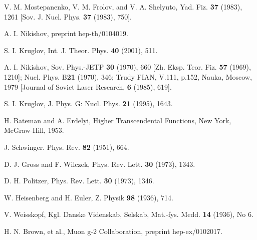 \documentclass[a4paper,12pt]{article}
\begin{document}
\begin{thebibliography}{99}
\bibitem{}  V. M. Mostepanenko, V. M. Frolov, and V. A. Shelyuto, Yad. Fiz.
\textbf{37} (1983), 1261 [Sov. J. Nucl. Phys. \textbf{37 }(1983), 750].

\bibitem{}  A. I. Nikishov, preprint hep-th/0104019.

\bibitem{}  S. I. Kruglov, Int. J. Theor. Phys. \textbf{40} (2001), 511.

\bibitem{}  A. I. Nikishov, Sov. Phys.-JETP \textbf{30} (1970), 660 [Zh.
Eksp. Teor. Fiz. \textbf{57} (1969), 1210]; Nucl. Phys. B\textbf{21 }(1970),
346; Trudy FIAN, V.111, p.152, Nauka, Moscow, 1979 [Journal of Soviet Laser
Research, \textbf{6 }(1985), 619].

\bibitem{}  S. I. Kruglov, J. Phys. G: Nucl. Phys. \textbf{21} (1995), 1643.

\bibitem{}  H. Bateman and A. Erdelyi, Higher Transcendental Functions, New
York, McGraw-Hill, 1953.

\bibitem{}  J. Schwinger. Phys. Rev. \textbf{82} (1951), 664.

\bibitem{}  D. J. Gross and F. Wilczek, Phys. Rev. Lett. \textbf{30} (1973),
1343.

\bibitem{}  D. H. Politzer, Phys. Rev. Lett. \textbf{30} (1973), 1346.

\bibitem{}  W. Heisenberg and H. Euler, Z. Physik \textbf{98} (1936), 714.

\bibitem{}  V. Weisskopf, Kgl. Danske Videnskab, Selskab, Mat.-fys. Medd.
\textbf{14} (1936), No 6.

\bibitem{}  H. N. Brown, et al., Muon g-2 Collaboration, preprint
hep-ex/0102017.
\end{thebibliography}
\end{document}
